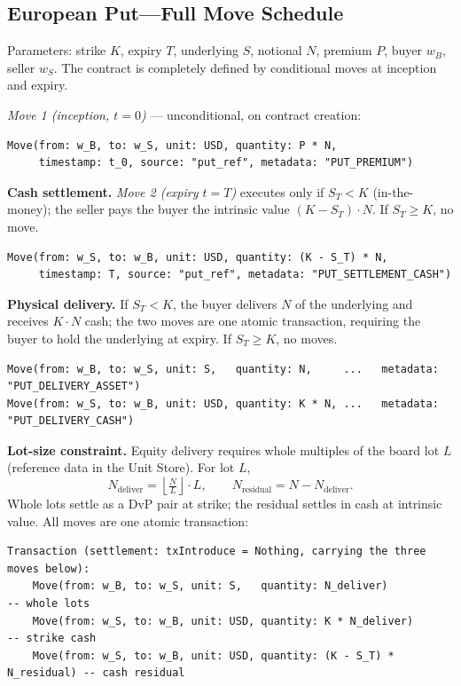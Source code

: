 \documentclass[11pt,a4paper]{article}
\begin{document}
\subsection{European Put---Full Move Schedule}

\noindent Parameters: strike $K$, expiry $T$, underlying $S$, notional $N$, premium $P$, buyer $w_B$, seller $w_S$. The contract is completely defined by conditional moves at inception and expiry.

\noindent\textit{Move 1 (inception, $t=0$)} --- unconditional, on contract creation:

\begin{lstlisting}
Move(from: w_B, to: w_S, unit: USD, quantity: P * N,
     timestamp: t_0, source: "put_ref", metadata: "PUT_PREMIUM")
\end{lstlisting}

\noindent\textbf{Cash settlement.} \textit{Move 2 (expiry $t=T$)} executes only if $S_T < K$ (in-the-money); the seller pays the buyer the intrinsic value $(K-S_T)\cdot N$. If $S_T \ge K$, no move.

\begin{lstlisting}
Move(from: w_S, to: w_B, unit: USD, quantity: (K - S_T) * N,
     timestamp: T, source: "put_ref", metadata: "PUT_SETTLEMENT_CASH")
\end{lstlisting}

\noindent\textbf{Physical delivery.} If $S_T < K$, the buyer delivers $N$ of the underlying and receives $K\cdot N$ cash; the two moves are one atomic transaction, requiring the buyer to hold the underlying at expiry. If $S_T \ge K$, no moves.

\begin{lstlisting}
Move(from: w_B, to: w_S, unit: S,   quantity: N,     ...   metadata: "PUT_DELIVERY_ASSET")
Move(from: w_S, to: w_B, unit: USD, quantity: K * N, ...   metadata: "PUT_DELIVERY_CASH")
\end{lstlisting}

\noindent\textbf{Lot-size constraint.} Equity delivery requires whole multiples of the board lot $L$ (reference data in the Unit Store). For lot $L$,
\[
N_{\text{deliver}} = \left\lfloor \tfrac{N}{L} \right\rfloor \cdot L, \qquad N_{\text{residual}} = N - N_{\text{deliver}}.
\]
Whole lots settle as a DvP pair at strike; the residual settles in cash at intrinsic value. All moves are one atomic transaction:

\begin{lstlisting}
Transaction (settlement: txIntroduce = Nothing, carrying the three moves below):
    Move(from: w_B, to: w_S, unit: S,   quantity: N_deliver)            -- whole lots
    Move(from: w_S, to: w_B, unit: USD, quantity: K * N_deliver)        -- strike cash
    Move(from: w_S, to: w_B, unit: USD, quantity: (K - S_T) * N_residual) -- cash residual
\end{lstlisting}
\end{document}
